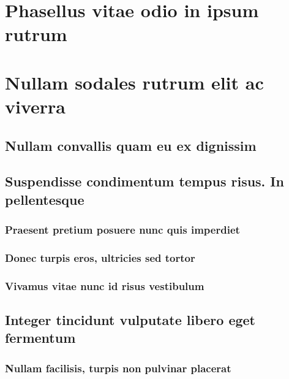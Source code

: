 \documentclass[bachelor, english, debug]{student}
\begin{document}
\lipsum[1-8]

\section{Phasellus vitae odio in ipsum rutrum}

\lipsum[1-8]

\section{Nullam sodales rutrum elit ac viverra}

\lipsum[1-8]

\subsection{Nullam convallis quam eu ex dignissim}

\lipsum[1-8]

\subsection{Suspendisse condimentum tempus risus. In pellentesque}

\lipsum[1-8]

\subsubsection{Praesent pretium posuere nunc quis imperdiet}

\lipsum[1-8]

\subsubsection{Donec turpis eros, ultricies sed tortor}

\lipsum[1-8]

\subsubsection{Vivamus vitae nunc id risus vestibulum}

\lipsum[1-8]

\subsection{Integer tincidunt vulputate libero eget fermentum}

\lipsum[1-8]

\subsubsection{Nullam facilisis, turpis non pulvinar placerat}
\end{document}
